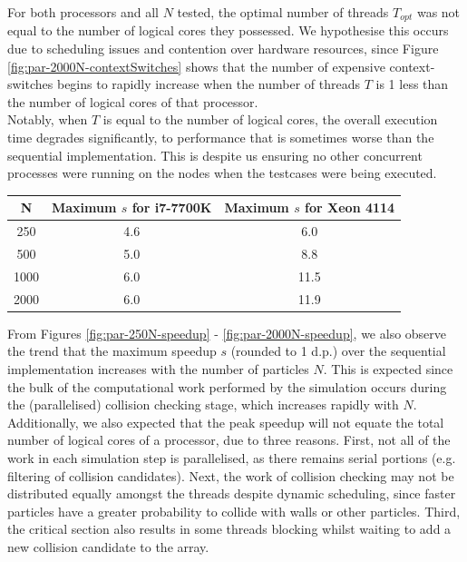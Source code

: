 \documentclass[12pt]{article}
\begin{document}
For both processors and all $N$ tested, the optimal number of threads $T_{opt}$ was not equal to the number of logical cores they possessed. We hypothesise this occurs due to scheduling issues and contention over hardware resources, since Figure \ref{fig:par-2000N-contextSwitches} shows that the number of expensive context-switches begins to rapidly increase when the number of threads $T$ is 1 less than the number of logical cores of that processor. \\

Notably, when $T$ is equal to the number of logical cores, the overall execution time degrades significantly, to performance that is sometimes worse than the sequential implementation. This is despite us ensuring no other concurrent processes were running on the nodes when the testcases were being executed.

\begin{center}
	\begin{tabular}{ | c | c | c | }
		\hline
		N & Maximum $s$ for i7-7700K & Maximum $s$ for Xeon 4114 \\ \hline
		250 & 4.6 & 6.0 \\ \hline
		500 & 5.0 & 8.8 \\ \hline
		1000 & 6.0 & 11.5 \\ \hline
		2000 & 6.0 & 11.9 \\ \hline
	\end{tabular}
\end{center}

From Figures \ref{fig:par-250N-speedup} - \ref{fig:par-2000N-speedup}, we also observe the trend that the maximum speedup $s$ (rounded to 1 d.p.) over the sequential implementation increases with the number of particles $N$. This is expected since the bulk of the computational work performed by the simulation occurs during the (parallelised) collision checking stage, which increases rapidly with $N$. \\

Additionally, we also expected that the peak speedup will not equate the total number of logical cores of a processor, due to three reasons. First, not all of the work in each simulation step is parallelised, as there remains serial portions (e.g. filtering of collision candidates). Next, the work of collision checking may not be distributed equally amongst the threads despite dynamic scheduling, since faster particles have a greater probability to collide with walls or other particles. Third, the critical section also results in some threads blocking whilst waiting to add a new collision candidate to the array.
\end{document}
